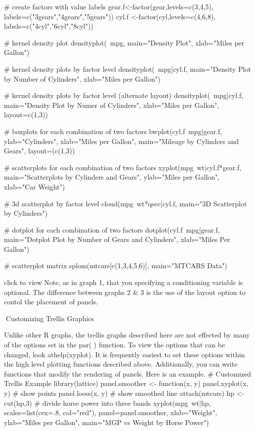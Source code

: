 # create factors with value labels 
gear.f<-factor(gear,levels=c(3,4,5),
   labels=c("3gears","4gears","5gears")) 
cyl.f <-factor(cyl,levels=c(4,6,8),
   labels=c("4cyl","6cyl","8cyl")) 

# kernel density plot 
densityplot(~mpg, 
   main="Density Plot", 
   xlab="Miles per Gallon")

# kernel density plots by factor level 
densityplot(~mpg|cyl.f, 
   main="Density Plot by Number of Cylinders",
   xlab="Miles per Gallon")

# kernel density plots by factor level (alternate layout) 
densityplot(~mpg|cyl.f, 
   main="Density Plot by Numer of Cylinders",
   xlab="Miles per Gallon", 
   layout=c(1,3))

# boxplots for each combination of two factors 
bwplot(cyl.f~mpg|gear.f,
   ylab="Cylinders", xlab="Miles per Gallon", 
   main="Mileage by Cylinders and Gears", 
   layout=(c(1,3))

# scatterplots for each combination of two factors 
xyplot(mpg~wt|cyl.f*gear.f, 
   main="Scatterplots by Cylinders and Gears", 
   ylab="Miles per Gallon", xlab="Car Weight")

# 3d scatterplot by factor level 
cloud(mpg~wt*qsec|cyl.f, 
   main="3D Scatterplot by Cylinders") 

# dotplot for each combination of two factors 
dotplot(cyl.f~mpg|gear.f, 
   main="Dotplot Plot by Number of Gears and Cylinders",
   xlab="Miles Per Gallon")

# scatterplot matrix 
splom(mtcars[c(1,3,4,5,6)], 
   main="MTCARS Data")

 
click to view
Note, as in graph 1, that you specifying a conditioning variable is optional. The difference between graphs 2 & 3 is the use of the layout option to contol the placement of panels.

Customizing Trellis Graphics


Unlike other R graphs, the trellis graphs described here are not effected by many of the options set in the par( ) function. To view the options that can be changed, look athelp(xyplot). It is frequently easiest to set these options within the high level plotting functions described above. Additionally, you can write functions that modify the rendering of panels. Here is an example.
# Customized Trellis Example
library(lattice)
panel.smoother <- function(x, y) {
  panel.xyplot(x, y) # show points 
  panel.loess(x, y)  # show smoothed line 
}
attach(mtcars)
hp <- cut(hp,3) # divide horse power into three bands 
xyplot(mpg~wt|hp, scales=list(cex=.8, col="red"),
   panel=panel.smoother,
   xlab="Weight", ylab="Miles per Gallon", 
   main="MGP vs Weight by Horse Power")


